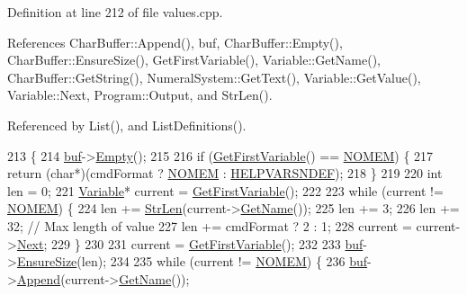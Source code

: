 Definition at line 212 of file values.\+cpp.



References Char\+Buffer\+::\+Append(), buf, Char\+Buffer\+::\+Empty(), Char\+Buffer\+::\+Ensure\+Size(), Get\+First\+Variable(), Variable\+::\+Get\+Name(), Char\+Buffer\+::\+Get\+String(), Numeral\+System\+::\+Get\+Text(), Variable\+::\+Get\+Value(), Variable\+::\+Next, Program\+::\+Output, and Str\+Len().



Referenced by List(), and List\+Definitions().


\begin{DoxyCode}
213 \{
214     \hyperlink{classVariableList_a11bf03542fab82869135f3f300890376}{buf}->\hyperlink{classCharBuffer_abe39d3fd7d8b9c8ec343af2cae7adc96}{Empty}();
215 
216     \textcolor{keywordflow}{if} (\hyperlink{classVariableList_a4b3bb4c1886ef7e0b15bfa5ecf4c52f4}{GetFirstVariable}() == \hyperlink{platform_8h_a46ff2bfbf0d44b8466a2251d5bd5e6f8}{NOMEM}) \{
217         \textcolor{keywordflow}{return} (\textcolor{keywordtype}{char}*)(cmdFormat ? \hyperlink{platform_8h_a46ff2bfbf0d44b8466a2251d5bd5e6f8}{NOMEM} : \hyperlink{text_8h_acff3b9ae20508bdc3020e2ff65665508}{HELPVARSNDEF});
218     \}
219 
220     \textcolor{keywordtype}{int} len = 0;
221     \hyperlink{classVariable}{Variable}* current = \hyperlink{classVariableList_a4b3bb4c1886ef7e0b15bfa5ecf4c52f4}{GetFirstVariable}();
222 
223     \textcolor{keywordflow}{while} (current != \hyperlink{platform_8h_a46ff2bfbf0d44b8466a2251d5bd5e6f8}{NOMEM}) \{
224         len += \hyperlink{clib_8h_a67ec56eb98b49515d35005a5b3bf9a32}{StrLen}(current->\hyperlink{classVariable_accf221d35cec8a9707e84891b715fb6c}{GetName}());
225         len += 3;
226         len += 32; \textcolor{comment}{// Max length of value}
227         len += cmdFormat ? 2 : 1;
228         current = current->\hyperlink{classVariable_ac5662d23fccccf25e3565793841ce580}{Next};
229     \}
230 
231     current = \hyperlink{classVariableList_a4b3bb4c1886ef7e0b15bfa5ecf4c52f4}{GetFirstVariable}();
232 
233     \hyperlink{classVariableList_a11bf03542fab82869135f3f300890376}{buf}->\hyperlink{classCharBuffer_ad1907009b5ad136692b989fa96bf2f7e}{EnsureSize}(len);
234 
235     \textcolor{keywordflow}{while} (current != \hyperlink{platform_8h_a46ff2bfbf0d44b8466a2251d5bd5e6f8}{NOMEM}) \{
236         \hyperlink{classVariableList_a11bf03542fab82869135f3f300890376}{buf}->\hyperlink{classCharBuffer_a045b38735f7b3007c1b98d3d7b7feafe}{Append}(current->\hyperlink{classVariable_accf221d35cec8a9707e84891b715fb6c}{GetName}());

\end{DoxyCode}
